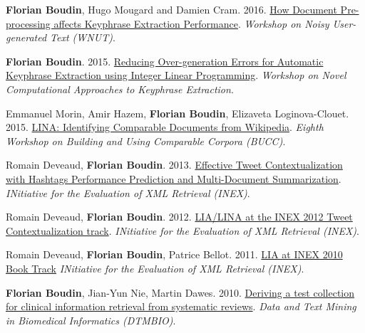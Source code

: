 \item 
\textbf{Florian Boudin}, Hugo Mougard and Damien Cram.
2016.
\href{https://aclanthology.org/W16-3917.pdf}{How Document Pre-processing affects Keyphrase Extraction Performance}.
\textit{Workshop on Noisy User-generated Text (WNUT)}.
\label{boudin-etal-2016-document}

\item 
\textbf{Florian Boudin}.
2015.
\href{https://aclanthology.org/W15-3605.pdf}{Reducing Over-generation Errors for Automatic Keyphrase Extraction using Integer Linear Programming}.
\textit{Workshop on Novel Computational Approaches to Keyphrase Extraction}.
\label{boudin-2015-reducing}

\item 
Emmanuel Morin, Amir Hazem, \textbf{Florian Boudin}, Elizaveta Loginova-Clouet.
2015.
\href{https://aclanthology.org/W15-3413.pdf}{LINA: Identifying Comparable Documents from Wikipedia}.
\textit{Eighth Workshop on Building and Using Comparable Corpora (BUCC)}.
\label{morin-etal-2015-lina}

\item 
Romain Deveaud, \textbf{Florian Boudin}.
2013.
\href{http://www.clef-initiative.eu/documents/71612/f20ff540-8fc7-476a-9c51-db20f8413cc6}{Effective Tweet Contextualization with Hashtags Performance Prediction and Multi-Document Summarization}.
\textit{INitiative for the Evaluation of XML Retrieval (INEX)}.
\label{deveaud-boudin-2013-effective}

\item 
Romain Deveaud, \textbf{Florian Boudin}.
2012.
\href{https://hal.science/hal-00755496/document}{LIA/LINA at the INEX 2012 Tweet Contextualization track}.
\textit{INitiative for the Evaluation of XML Retrieval (INEX)}.
\label{deveaud-boudin-2012-lia}

\item 
Romain Deveaud, \textbf{Florian Boudin}, Patrice Bellot.
2011.
\href{https://link.springer.com/chapter/10.1007/978-3-642-23577-1_10}{LIA at INEX 2010 Book Track}
\textit{INitiative for the Evaluation of XML Retrieval (INEX)}.
\label{deveaud-etal-2011-lia}

\item 
\textbf{Florian Boudin}, Jian-Yun Nie, Martin Dawes.
2010.
\href{https://dl.acm.org/doi/10.1145/1871871.1871882}{Deriving a test collection for clinical information retrieval from systematic reviews}.
\textit{Data and Text Mining in Biomedical Informatics (DTMBIO)}.
\label{boudin-etal-2010-deriving}

